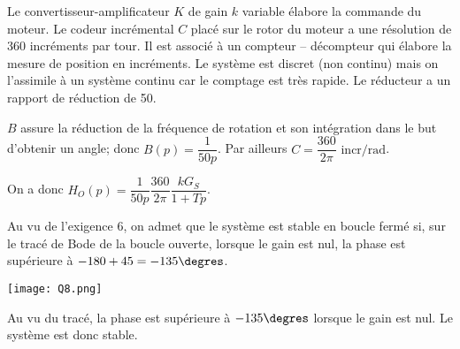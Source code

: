 \begin{multicols}{2}
Le convertisseur-amplificateur $K$ de gain $k$ variable élabore la commande du moteur.
Le codeur incrémental $C$ placé sur le rotor du moteur a une résolution de 360 incréments par tour. Il est associé à un compteur -- décompteur qui élabore la mesure de position en incréments. 
Le système est discret (non continu) mais on l’assimile à un système continu car le comptage est très rapide. 
Le réducteur a un rapport de réduction de 50.
 
 \fi
 
\ifprof
\begin{corrige}
$B$ assure la réduction de la fréquence de rotation et son intégration dans le but d'obtenir un angle; donc $B(p)=\dfrac{1}{50p}$.
Par ailleurs $C=\dfrac{360}{2\pi}\text{ incr/rad} $. 

On a donc $H_O(p)=\dfrac{1}{50p}\dfrac{360}{2\pi} \dfrac{kG_S}{1+Tp}$.
\end{corrige}
\else
\fi


\begin{rem}
Au vu de l'exigence 6, on admet que le système est stable en boucle fermé si, sur le tracé de Bode de la boucle ouverte, lorsque le gain est nul, la phase est supérieure à $-180+45=-135\degres$. 
\end{rem}

\ifprof



\begin{center}
\texttt{[image: Q8.png]}
\end{center}
\begin{corrige}
Au vu du tracé, la phase est supérieure à $-135\degres$ lorsque le gain est nul. Le système est donc stable.
\end{corrige}
\else
\fi

% 


\end{multicols}
